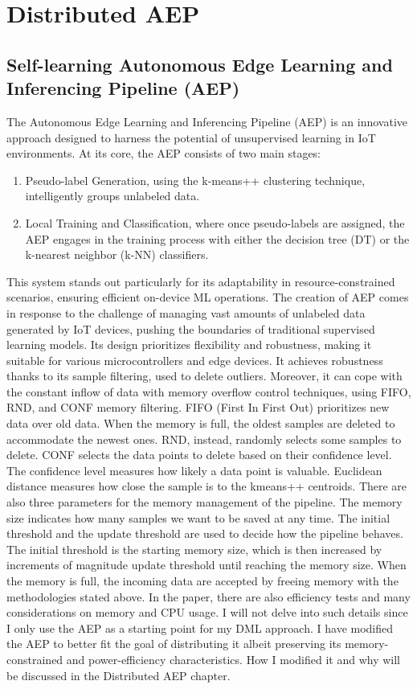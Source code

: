 \chapter{Distributed AEP}

\section{Self-learning Autonomous Edge Learning and Inferencing Pipeline (AEP)}
\label{AEP}
The Autonomous Edge Learning and Inferencing Pipeline (AEP) is an innovative approach designed to harness the potential of unsupervised learning in IoT environments. At its core, the AEP consists of two main stages:
\begin{enumerate}
    \item Pseudo-label Generation, using the k-means++ clustering technique, intelligently groups unlabeled data.
    \item Local Training and Classification, where once pseudo-labels are assigned, the AEP engages in the training process with either the decision tree (DT) or the k-nearest neighbor (k-NN) classifiers.
\end{enumerate}

This system stands out particularly for its adaptability in resource-constrained scenarios, ensuring efficient on-device ML operations. The creation of AEP comes in response to the challenge of managing vast amounts of unlabeled data generated by IoT devices, pushing the boundaries of traditional supervised learning models. Its design prioritizes flexibility and robustness, making it suitable for various microcontrollers and edge devices. It achieves robustness thanks to its sample filtering, used to delete outliers. Moreover, it can cope with the constant inflow of data with memory overflow control techniques, using FIFO, RND, and CONF memory filtering. FIFO (First In First Out) prioritizes new data over old data. When the memory is full, the oldest samples are deleted to accommodate the newest ones. RND, instead, randomly selects some samples to delete. CONF selects the data points to delete based on their confidence level. The confidence level measures how likely a data point is valuable. Euclidean distance measures how close the sample is to the kmeans++ centroids. There are also three parameters for the memory management of the pipeline. The memory size indicates how many samples we want to be saved at any time. The initial threshold and the update threshold are used to decide how the pipeline behaves. The initial threshold is the starting memory size, which is then increased by increments of magnitude update threshold until reaching the memory size. When the memory is full, the incoming data are accepted by freeing memory with the methodologies stated above. In the paper, there are also efficiency tests and many considerations on memory and CPU usage. I will not delve into such details since I only use the AEP as a starting point for my DML approach. I have modified the AEP to better fit the goal of distributing it albeit preserving its memory-constrained and power-efficiency characteristics. How I modified it and why will be discussed in the Distributed AEP chapter.


